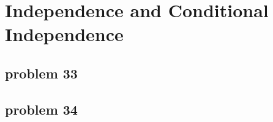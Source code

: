 \section{Independence and Conditional Independence}

\subsection{problem 33}


\subsection{problem 34}



